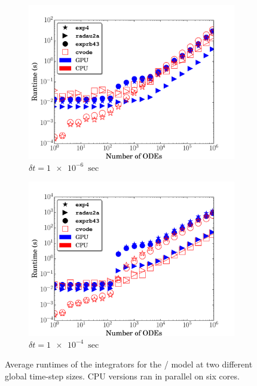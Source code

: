\documentclass[preprint]{elsarticle}
\begin{document}
\begin{figure}[htb]
  \centering
  \begin{subfigure}{0.49\textwidth}
      \includegraphics[width=\linewidth]{H2_1e-06_cpuvsgpu.pdf}
      \caption{$\delta t = \SI{1e-6}{\sec}$}   
  \end{subfigure}
  \begin{subfigure}{0.49\textwidth}
      \includegraphics[width=\linewidth]{H2_1e-04_cpuvsgpu.pdf}
      \caption{$\delta t = \SI{1e-4}{\sec}$}
  \end{subfigure}
  \caption{Average runtimes of the integrators for the \slash{} model at two different global time-step sizes. 
  CPU versions ran in parallel on six cores.}
  \label{F:H2_perf}
\end{figure}
\end{document}
